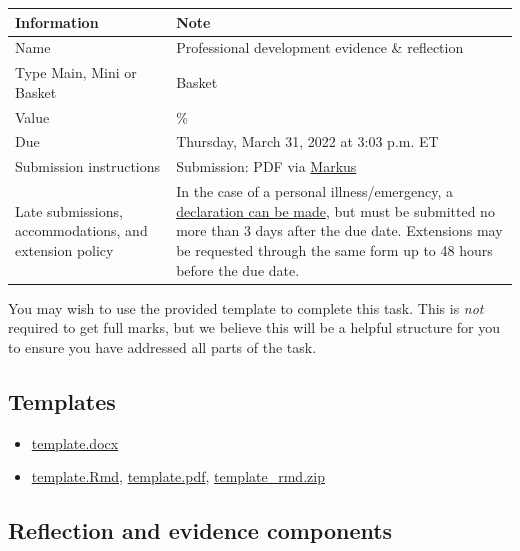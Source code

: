 \documentclass[
  openany]{book}
\begin{document}
\begin{longtable}[]{@{}
  >{\raggedright\arraybackslash}p{}
  >{\raggedright\arraybackslash}p{}@{}}
\toprule
\textbf{Information} & \textbf{Note} \\
\midrule
\endhead
Name & Professional development evidence \& reflection \\
Type Main, Mini or Basket & Basket \\
Value & 3\% \\
Due & Thursday, March 31, 2022 at 3:03 p.m. ET \\
Submission instructions & Submission: PDF via \href{https://markus-ds.teach.cs.toronto.edu/}{Markus} \\
Late submissions, accommodations, and extension policy & In the case of a personal illness/emergency, a \href{https://forms.office.com/Pages/ResponsePage.aspx?id=JsKqeAMvTUuQN7RtVsVSEOKHUU3SzAJJhmOKjJhDWEpUNTFDSzhZTFlXUzVYMVlNM1FEUTRZMkVWOC4u}{declaration can be made}, but must be submitted no more than 3 days after the due date. Extensions may be requested through the same form up to 48 hours before the due date. \\
\bottomrule
\end{longtable}

You may wish to use the provided template to complete this task. This is \emph{not} required to get full marks, but we believe this will be a helpful structure for you to ensure you have addressed all parts of the task.

\hypertarget{templates}{%
\subsection{Templates}\label{templates}}

\begin{itemize}
\item
  \href{https://sta303-bolton.github.io/sta303-w22-courseguide/other-files/template.docx}{template.docx}
\item
  \href{https://sta303-bolton.github.io/sta303-w22-courseguide/other-files/template.Rmd}{template.Rmd}, \href{https://sta303-bolton.github.io/sta303-w22-courseguide/other-files/template.pdf}{template.pdf}, \href{https://sta303-bolton.github.io/sta303-w22-courseguide/other-files/template_rmd.zip}{template\_rmd.zip}
\end{itemize}

\hypertarget{reflection-and-evidence-components}{%
\subsection{Reflection and evidence components}\label{reflection-and-evidence-components}}
\end{document}
